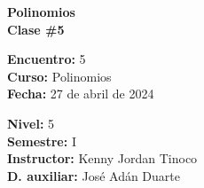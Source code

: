 \begin{center} \textbf
{
    \Large Polinomios \\ \vspace{2mm}Clase \#5
}
\end{center}

\begin{multicols}{2}
{
    \textbf{Encuentro:} 5\\
    \textbf{Curso:} Polinomios\\
    \textbf{Fecha:} 27 de abril de 2024\\
    \begin{flushright}
        \textbf{Nivel:} 5\\
        \textbf{Semestre:} I\\
        \textbf{Instructor:} Kenny Jordan Tinoco\\
        \textbf{D. auxiliar: }José Adán Duarte
    \end{flushright}
}
\end{multicols}

\thispagestyle{first-page-style}